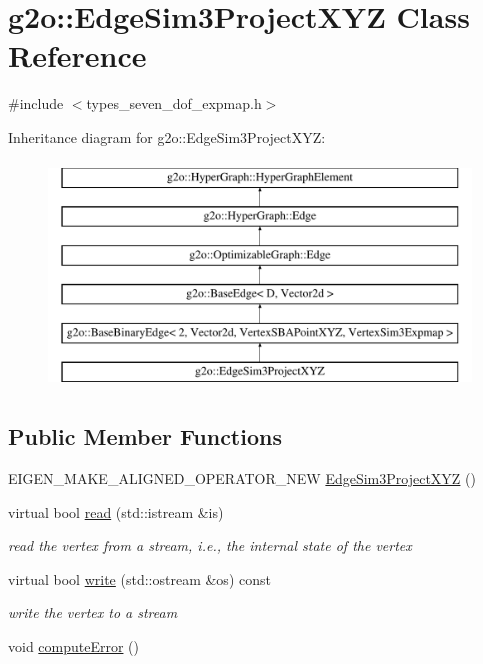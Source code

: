 \hypertarget{classg2o_1_1_edge_sim3_project_x_y_z}{}\section{g2o\+:\+:Edge\+Sim3\+Project\+X\+YZ Class Reference}
\label{classg2o_1_1_edge_sim3_project_x_y_z}


{\ttfamily \#include $<$types\+\_\+seven\+\_\+dof\+\_\+expmap.\+h$>$}

Inheritance diagram for g2o\+:\+:Edge\+Sim3\+Project\+X\+YZ\+:\begin{figure}[H]
\begin{center}
\leavevmode
\includegraphics[height=6.000000cm]{classg2o_1_1_edge_sim3_project_x_y_z}
\end{center}
\end{figure}
\subsection*{Public Member Functions}
\begin{DoxyCompactItemize}
\item 
E\+I\+G\+E\+N\+\_\+\+M\+A\+K\+E\+\_\+\+A\+L\+I\+G\+N\+E\+D\+\_\+\+O\+P\+E\+R\+A\+T\+O\+R\+\_\+\+N\+EW \mbox{\hyperlink{classg2o_1_1_edge_sim3_project_x_y_z_a97beb2afff3d5b8bb6d19dccd032da14}{Edge\+Sim3\+Project\+X\+YZ}} ()
\item 
virtual bool \mbox{\hyperlink{classg2o_1_1_edge_sim3_project_x_y_z_aaf72b3f12f99f131e6c3395baf796fe9}{read}} (std\+::istream \&is)
\begin{DoxyCompactList}\small\item\em read the vertex from a stream, i.\+e., the internal state of the vertex \end{DoxyCompactList}\item 
virtual bool \mbox{\hyperlink{classg2o_1_1_edge_sim3_project_x_y_z_a9fe2dd1cff33b5c7d50d871b8e92bcc2}{write}} (std\+::ostream \&os) const
\begin{DoxyCompactList}\small\item\em write the vertex to a stream \end{DoxyCompactList}\item 
void \mbox{\hyperlink{classg2o_1_1_edge_sim3_project_x_y_z_ae821156265db463d49b9ac2166186274}{compute\+Error}} ()
\end{DoxyCompactItemize}
